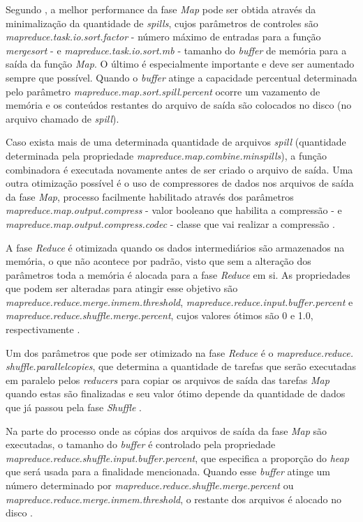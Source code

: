 Segundo \textcite{HadoopBook15}, a melhor performance da fase \textit{Map} pode ser obtida através da minimalização da quantidade de \textit{spills}, cujos parâmetros de controles são \textit{mapreduce.task.io.sort.factor} - número máximo de entradas para a função \textit{\gls{mergesort}} - e \textit{mapreduce.task.io.sort.mb} - tamanho do \textit{\gls{buffer}} de memória para a saída da função \textit{Map}. O último é especialmente importante e deve ser aumentado sempre que possível. Quando o \textit{\gls{buffer}} atinge a capacidade percentual determinada pelo parâmetro \textit{mapreduce.map.sort.spill.percent} ocorre um vazamento de memória e os conteúdos restantes do arquivo de saída são colocados no disco (no arquivo chamado de \textit{spill}).

Caso exista mais de uma determinada quantidade de arquivos \textit{spill} (quantidade determinada pela propriedade \textit{mapreduce.map.combine.minspills}), a função combinadora é executada novamente antes de ser criado o arquivo de saída. Uma outra otimização possível é o uso de compressores de dados nos arquivos de saída da fase \textit{Map}, processo facilmente habilitado através dos parâmetros \textit{mapreduce.map.output.compress} - valor booleano que habilita a compressão - e \textit{mapreduce.map.output.compress.codec} - classe que vai realizar a compressão \cite{HadoopBook15}.

A fase \textit{Reduce} é otimizada quando os dados intermediários são armazenados na memória, o que não acontece por padrão, visto que sem a alteração dos parâmetros toda a memória é alocada para a fase \textit{Reduce} em si. As propriedades que podem ser alteradas para atingir esse objetivo são \textit{mapreduce.reduce.merge.inmem.threshold}, \textit{mapreduce.reduce.input.buffer.percent} e \textit{mapreduce.reduce.shuffle.merge.percent}, cujos valores ótimos são 0 e 1.0, respectivamente \cite{HadoopBook15}.

Um dos parâmetros que pode ser otimizado na fase \textit{Reduce} é o \textit{mapreduce.reduce. shuffle.parallelcopies}, que determina a quantidade de tarefas que serão executadas em paralelo pelos \textit{reducers} para copiar os arquivos de saída das tarefas \textit{Map} quando estas são finalizadas e seu valor ótimo depende da quantidade de dados que já passou pela fase \textit{Shuffle} \cite{MRONLINELi14}.

Na parte do processo onde as cópias dos arquivos de saída da fase \textit{Map} são executadas, o tamanho do \textit{\gls{buffer}} é controlado pela propriedade \textit{mapreduce.reduce.shuffle.input.buffer.percent}, que especifica a proporção do \textit{\gls{heap}} que será usada para a finalidade mencionada. Quando esse \textit{\gls{buffer}} atinge um número determinado por \textit{mapreduce.reduce.shuffle.merge.percent} ou \textit{mapreduce.reduce.merge.inmem.threshold}, o restante dos arquivos é alocado no disco \cite{HadoopBook15}.

